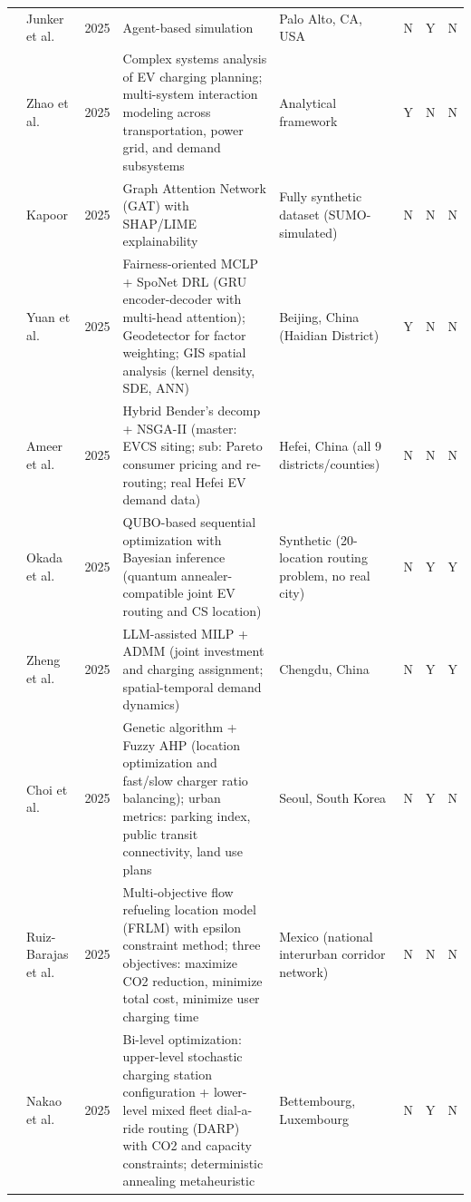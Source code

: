 \documentclass[letterpaper, 12pt, oneside, doublespacing]{Thesis}
\begin{document}
\begin{longtable}{L{0.9cm} L{1.8cm} L{0.7cm} L{2.5cm} L{2.1cm} L{0.7cm} L{0.7cm} L{0.7cm}}
\cite{data-driven_optimization_2025} & Junker et al. & 2025 & Agent-based simulation & Palo Alto, CA, USA & N & Y & N \\
\cite{electric_vehicle_2025} & Zhao et al. & 2025 & Complex systems analysis of EV charging planning; multi-system interaction modeling across transportation, power grid, and demand subsystems & Analytical framework & Y & N & N \\
\cite{explainable_and_2025} & Kapoor & 2025 & Graph Attention Network (GAT) with SHAP/LIME explainability & Fully synthetic dataset (SUMO-simulated) & N & N & N \\
\cite{fairness-oriented_charging_2025} & Yuan et al. & 2025 & Fairness-oriented MCLP + SpoNet DRL (GRU encoder-decoder with multi-head attention); Geodetector for factor weighting; GIS spatial analysis (kernel density, SDE, ANN) & Beijing, China (Haidian District) & Y & N & N \\
\cite{hybrid_optimization_2025} & Ameer et al. & 2025 & Hybrid Bender's decomp + NSGA-II (master: EVCS siting; sub: Pareto consumer pricing and re-routing; real Hefei EV demand data) & Hefei, China (all 9 districts{\slash}counties) & N & N & N \\
\cite{joint_optimization_2025} & Okada et al. & 2025 & QUBO-based sequential optimization with Bayesian inference (quantum annealer-compatible joint EV routing and CS location) & Synthetic (20-location routing problem, no real city) & N & Y & Y \\
\cite{large_language_2025} & Zheng et al. & 2025 & LLM-assisted MILP + ADMM (joint investment and charging assignment; spatial-temporal demand dynamics) & Chengdu, China & N & Y & Y \\
\cite{location_and_2025} & Choi et al. & 2025 & Genetic algorithm + Fuzzy AHP (location optimization and fast/slow charger ratio balancing); urban metrics: parking index, public transit connectivity, land use plans & Seoul, South Korea & N & Y & N \\
\cite{multiobjective_model_2025} & Ruiz-Barajas et al. & 2025 & Multi-objective flow refueling location model (FRLM) with epsilon constraint method; three objectives: maximize CO2 reduction, minimize total cost, minimize user charging time & Mexico (national interurban corridor network) & N & N & N \\
\cite{optimal_mixed_2025} & Nakao et al. & 2025 & Bi-level optimization: upper-level stochastic charging station configuration + lower-level mixed fleet dial-a-ride routing (DARP) with CO2 and capacity constraints; deterministic annealing metaheuristic & Bettembourg, Luxembourg & N & Y & N \\

\end{longtable}
\end{document}
